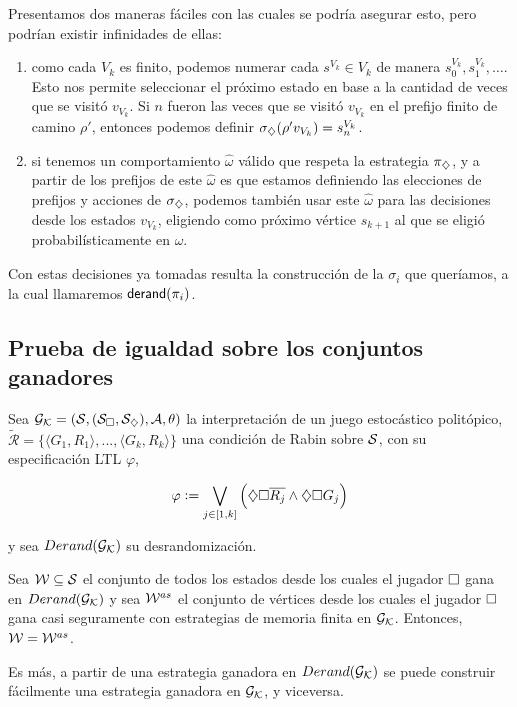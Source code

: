 \begin{boxgris}{}
	Presentamos dos maneras fáciles con las cuales se podría asegurar esto, pero
	podrían existir infinidades de ellas:
	\begin{enumerate}
		\item como cada $V_k$ es finito, podemos numerar cada $s^{V_k} \in V_k$ de manera
		      $s_0^{V_k}, s_1^{V_k}, \dots$. Esto nos permite seleccionar el próximo estado
		      en base a la cantidad de veces que se visitó $v_{V_k}$. Si $n$ fueron las veces
		      que se visitó $v_{V_k}$ en el prefijo finito de camino $\rho '$, entonces
		      podemos definir $\sigma_\diamondsuit(\rho ' v_{V_k}) = s_n^{V_k}$.
		\item si tenemos un comportamiento $\hat \omega$ válido que respeta la estrategia
		      $\pi_\diamondsuit$, y a partir de los prefijos de este $\hat \omega$ es que estamos
		      definiendo las elecciones de prefijos y acciones de $\sigma_\diamondsuit$, podemos
		      también usar este $\hat \omega$ para las decisiones desde los estados
		      $v_{V_k}$, eligiendo como próximo vértice $s_{k+1}$ al que se eligió
		      probabilísticamente en $\hat \omega$.
	\end{enumerate}
\end{boxgris}

Con estas decisiones ya tomadas resulta la construcción de la $\sigma_i$ que
queríamos, a la cual llamaremos $\textsf{derand}(\pi_i)$.

\subsection{Prueba de igualdad sobre los conjuntos ganadores}

\begin{theorem}
	\label{teocuali}
	Sea $\mathcal{G}_{\mathcal{K}} = (\mathcal{S}, (\mathcal{S}_\square, \mathcal{S}_\diamondsuit), \mathcal{A}, \theta)$ la interpretación de un juego estocástico politópico, $\widetilde{\mathcal{R}} = \{ \langle G_1, R_1 \rangle, ..., \langle G_k, R_k \rangle \}$ una condición de Rabin sobre $\mathcal{S}$, con su especificación LTL $\varphi$,

	$$
		\varphi := \bigvee_{j \in [1, k]} \left( \diamondsuit \square \overline{R_j} \wedge \diamondsuit \square G_j \right)
	$$

	y sea $Derand(\mathcal{G}_{\mathcal{K}})$ su desrandomización.

	Sea $\mathcal{W} \subseteq \mathcal{S}$ el conjunto de todos los estados desde los cuales el
	jugador $\square$ gana en $Derand(\mathcal{G}_{\mathcal{K}})$ y sea $\mathcal{W}^{as}$ el conjunto de vértices desde
	los cuales el jugador $\square$ gana casi seguramente con estrategias de memoria
	finita en $\mathcal{G}_{\mathcal{K}}$. Entonces, $\mathcal{W} = \mathcal{W}^{as}$.

	Es más, a partir de una estrategia ganadora en $Derand(\mathcal{G}_{\mathcal{K}})$ se puede construir
	fácilmente una estrategia ganadora en $\mathcal{G}_{\mathcal{K}}$, y viceversa.
\end{theorem}

